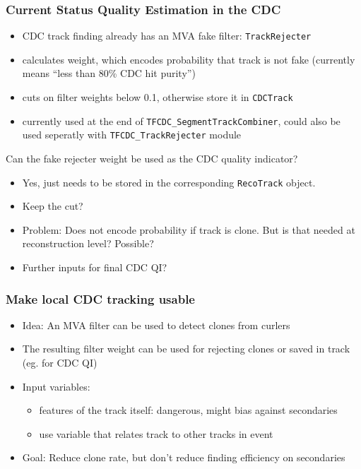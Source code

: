 \documentclass[18pt]{beamer}
\begin{document}
\begin{frame}
  \frametitle{Current Status Quality Estimation in the CDC}
  \begin{itemize}
  \item CDC track finding already has an MVA fake filter: \texttt{TrackRejecter}
  \item calculates weight, which encodes probability that track is not fake (currently means ``less than 80\% CDC hit purity'')
  \item cuts on filter weights below 0.1, otherwise store it in \texttt{CDCTrack}
  \item currently used at the end of \texttt{TFCDC\_SegmentTrackCombiner}, could also be used seperatly with \texttt{TFCDC\_TrackRejecter} module
  \end{itemize}
  \begin{block}{Can the fake rejecter weight be used as the CDC quality indicator?}
    \begin{itemize}
    \item Yes, just needs to be stored in the corresponding \texttt{RecoTrack} object.
    \item Keep the cut?
    \item \textcolor{kit-red100}{Problem:} Does not encode probability if track is clone. But is that needed at reconstruction level? Possible?
    \item Further inputs for final CDC QI?
    \end{itemize}
  \end{block}

\end{frame}



\begin{frame}
  \frametitle{Make local CDC tracking usable}
  \begin{itemize}
  \item Idea: An MVA filter can be used to detect clones from curlers
  \item The resulting filter weight can be used for rejecting clones or saved in track (eg. for CDC QI)
  \item Input variables:
    \begin{itemize}
    \item features of the track itself: dangerous, might bias against secondaries
    \item use variable that relates track to other tracks in event
    \end{itemize}
  \item Goal: Reduce clone rate, but don't reduce finding efficiency on secondaries
  \end{itemize}
\end{frame}
\end{document}
